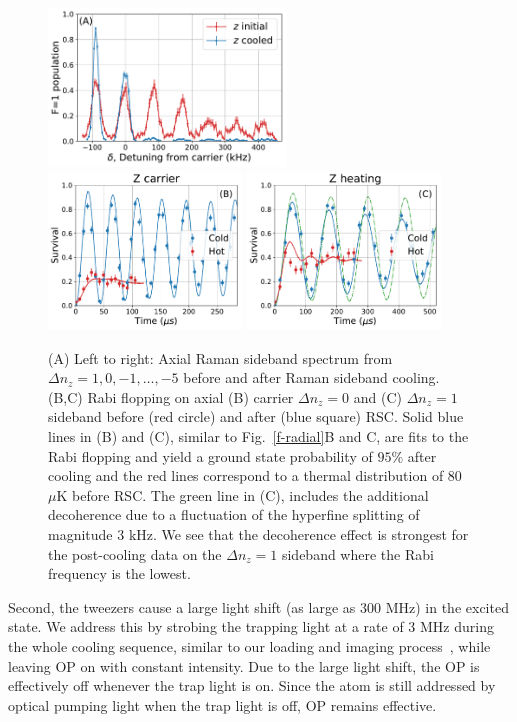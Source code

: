 \documentclass[aps,prl,twocolumn,groupedaddress]{revtex4-1}
\begin{document}
\begin{figure}
  \includegraphics[height=4.2cm]{spectrum_az.pdf}
  \includegraphics[height=4.2cm]{rabi_flop_az_0.pdf}
  \includegraphics[height=4.2cm]{rabi_flop_az_p1.pdf}
  \caption{(A) Left to right: Axial Raman sideband spectrum from $\Delta n_z=1,0,-1,\ldots,-5$
    before and after Raman sideband cooling.
    (B,C) Rabi flopping on axial (B) carrier $\Delta n_z=0$  and (C) $\Delta n_z=1$ sideband
    before (red circle) and after (blue square) RSC.
    Solid blue lines in (B) and (C), similar to Fig.~\ref{f-radial}B and C,
    are fits to the Rabi flopping and yield a ground state probability of $95$\%
    after cooling and
    the red lines correspond to a thermal distribution of $80$ $\mu$K before RSC.
    The green line in (C), includes the additional decoherence due to
    a fluctuation of the hyperfine splitting of magnitude $3$ kHz.
    We see that the decoherence effect is strongest for the post-cooling data on
    the $\Delta n_z=1$ sideband where the Rabi frequency is the lowest.
    \label{f-axial}}
\end{figure}

Second, the tweezers cause a large light shift (as large as $300$ MHz) in the excited state.
We address this by strobing the trapping light at a rate of 3 MHz
during the whole cooling sequence,
similar to our loading and imaging process~\cite{Hutzler2017-LightShifts},
while leaving OP on with constant intensity.
Due to the large light shift, the OP is effectively off whenever the trap light is on.
Since the atom is still addressed by optical pumping light when the trap light is off,
OP remains effective.
\end{document}
